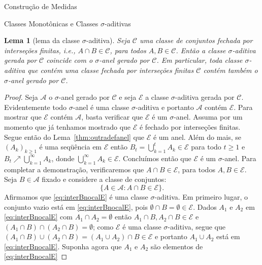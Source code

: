 \documentclass[oneside,final,11pt]{amsbook}
\theoremstyle{remark}\newtheorem{exercise}{Exercício}[chapter]
\theoremstyle{remark}\newtheorem{*exercise}[exercise]{\hbox to 0pt{\hskip 0pt minus 1fil*}Exercício}
\theoremstyle{definition}\newtheorem{exdefin}{Definição}[chapter]
\theoremstyle{plain}\newtheorem{teo}{Teorema}[section]
\theoremstyle{plain}\newtheorem{lem}[teo]{Lema}
\theoremstyle{plain}\newtheorem{prop}[teo]{Proposição}
\theoremstyle{plain}\newtheorem{cor}[teo]{Corolário}
\theoremstyle{definition}\newtheorem{defin}[teo]{Definição}
\theoremstyle{remark}\newtheorem{rem}[teo]{Observação}
\theoremstyle{definition}\newtheorem{notation}[teo]{Notação}
\theoremstyle{definition}\newtheorem{convention}[teo]{Convenção}
\theoremstyle{definition}\newtheorem{example}[teo]{Exemplo}
\numberwithin{section}{chapter}
\numberwithin{equation}{section}
\begin{document}
\begin{chapter}{Construção de Medidas}
\begin{section}{Classes Monotônicas e Classes ${\sigma}$-aditivas}
\begin{lem}[lema da classe $\sigma$-aditiva]
\label{thm:lemsigmaclass}
Seja $\mathcal C$ uma classe de conjuntos {\em fechada por interseções finitas},%
i.e., $A\cap B\in\mathcal C$, para
todos $A,B\in\mathcal C$. Então a classe $\sigma$-aditiva gerada por $\mathcal C$ coincide com o $\sigma$-anel
gerado por $\mathcal C$. Em particular, toda classe $\sigma$-aditiva que contém uma classe fechada por interseções
finitas $\mathcal C$ contém também o $\sigma$-anel gerado por $\mathcal C$.
\end{lem}
\begin{proof}
Seja $\mathcal A$ o $\sigma$-anel gerado por $\mathcal C$ e seja $\mathcal E$ a classe $\sigma$-aditiva gerada
por $\mathcal C$. Evidentemente todo $\sigma$-anel é uma classe $\sigma$-aditiva e portanto
$\mathcal A$ contém $\mathcal E$. Para mostrar que $\mathcal E$ contém $\mathcal A$, basta verificar que
$\mathcal E$ é um $\sigma$-anel. Assuma por um momento que já tenhamos mostrado que $\mathcal E$ é fechado
por interseções finitas. Segue então do Lema~\ref{thm:outradefanel} que $\mathcal E$ é um anel.
Além do mais, se $(A_k)_{k\ge1}$ é uma seqüência em $\mathcal E$ então $B_t=\bigcup_{k=1}^tA_k\in\mathcal E$ para
todo $t\ge1$ e $B_t\nearrow\bigcup_{k=1}^\infty A_k$, donde $\bigcup_{k=1}^\infty A_k\in\mathcal E$. Concluímos então
que $\mathcal E$ é um $\sigma$-anel. Para completar a demonstração, verificaremos que $A\cap B\in\mathcal E$,
para todos $A,B\in\mathcal E$. Seja $B\in\mathcal A$ fixado e considere a classe de conjuntos:
\begin{equation}\label{eq:interBnocalE}
\big\{A\in\mathcal A:A\cap B\in\mathcal E\big\}.
\end{equation}
Afirmamos que \eqref{eq:interBnocalE} é uma classe $\sigma$-aditiva. Em primeiro lugar, o conjunto vazio está em
\eqref{eq:interBnocalE}, pois $\emptyset\cap B=\emptyset\in\mathcal E$. Dados $A_1$ e $A_2$ em \eqref{eq:interBnocalE}
com $A_1\cap A_2=\emptyset$ então $A_1\cap B,A_2\cap B\in\mathcal E$ e $(A_1\cap B)\cap(A_2\cap B)=\emptyset$;
como $\mathcal E$ é uma classe $\sigma$-aditiva, segue que $(A_1\cap B)\cup(A_2\cap B)=(A_1\cup A_2)\cap B\in\mathcal E$
e portanto $A_1\cup A_2$ está em \eqref{eq:interBnocalE}. Suponha agora que $A_1$ e $A_2$ são elementos de \eqref{eq:interBnocalE}

\end{proof}
\end{section}
\end{chapter}
\end{document}
